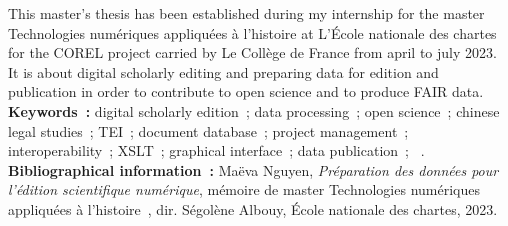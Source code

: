 \medskip	

This master's thesis has been established during my internship for the master \og Technologies numériques appliquées à l'histoire \fg at L'École nationale des chartes for the COREL project carried by Le Collège de France from april to july 2023. It is about digital scholarly editing and preparing data for edition and publication in order to contribute to open science and to produce FAIR data.\\

\textbf{Keywords~:} digital scholarly edition~; data processing~; open science~; chinese legal studies~; TEI~; document database~; project management~; interoperability~; XSLT~; graphical interface~; data publication~; \tp~.\\

\textbf{Bibliographical information~:} Maëva Nguyen, \textit{Préparation des données pour l'édition scientifique numérique}, mémoire de master \og Technologies numériques appliquées à l'histoire~\fg, dir. Ségolène Albouy, École nationale des chartes, 2023.
	
\clearemptydoublepage